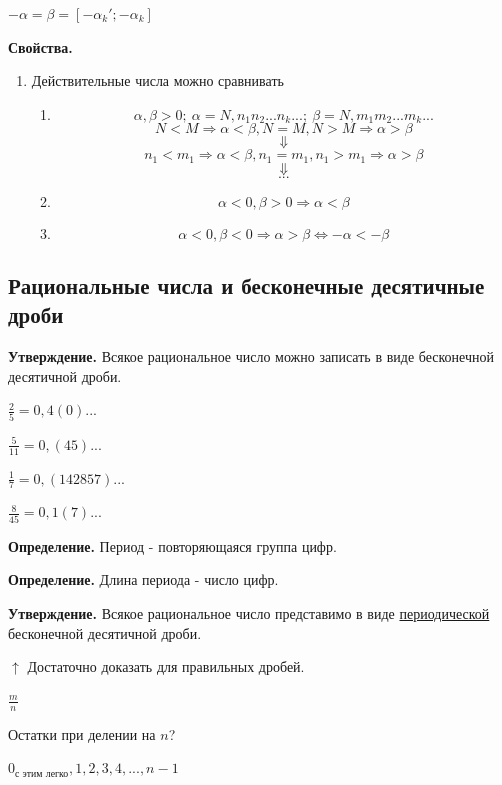 \documentclass{article}
\begin{document}
        $-\alpha = \beta = [-\alpha_k'; -\alpha_k]$

        \textbf{Свойства.}

        \begin{enumerate}[0.]
            \item Действительные числа можно сравнивать
            \begin{enumerate}[1.]
                \item \[\alpha, \beta > 0;\ \alpha = N,n_1n_2...n_k...;\ \beta = N,m_1m_2...m_k...\]
                \[N < M \Rightarrow \alpha < \beta, N = M, N > M \Rightarrow \alpha > \beta\]
                \[\Downarrow\]
                \[n_1 < m_1 \Rightarrow \alpha < \beta, n_1 = m_1, n_1 > m_1 \Rightarrow \alpha > \beta\]
                \[\Downarrow\]
                \[...\]
                \item \[\alpha < 0, \beta > 0 \Rightarrow \alpha < \beta\]
                \item \[\alpha < 0, \beta < 0 \Rightarrow \alpha > \beta \Leftrightarrow -\alpha < -\beta\]
            \end{enumerate}
        \end{enumerate}

        \subsection{Рациональные числа и бесконечные десятичные дроби}
        \textbf{Утверждение.} Всякое рациональное число можно записать в виде бесконечной десятичной дроби. 

        $\frac{2}{5} = 0,4(0)...$

        $\frac{5}{11} = 0,(45)...$

        $\frac{1}{7} = 0,(142857)...$

        $\frac{8}{45} = 0,1(7)...$

        \textbf{Определение.} Период - повторяющаяся группа цифр.

        \textbf{Определение.} Длина периода - число цифр.

        \textbf{Утверждение.} Всякое рациональное число представимо в виде \underline{периодической} бесконечной десятичной дроби.

        $\uparrow$ Достаточно доказать для правильных дробей.

        $\frac{m}{n}$

        Остатки при делении на $n$?

        $0_{\textrm{с этим легко}}, 1, 2, 3, 4, ..., n - 1$
\end{document}
